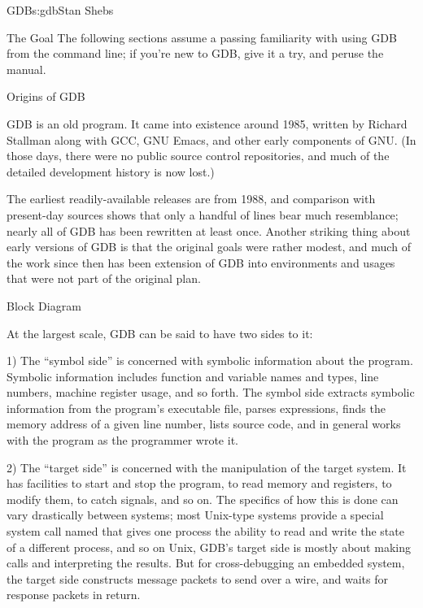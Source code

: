 \begin{aosachapter}{GDB}{s:gdb}{Stan Shebs}
\begin{aosasect1}{The Goal}
The following sections assume a passing familiarity with using GDB
from the command line; if you're new to GDB, give it a try, and peruse
the manual.\cite{bib:gdb-manual}

\end{aosasect1}

\begin{aosasect1}{Origins of GDB}

GDB is an old program.  It came into existence around 1985, written by
Richard Stallman along with GCC, GNU Emacs, and other early components
of GNU.  (In those days, there were no public source control
repositories, and much of the detailed development history is now
lost.)

The earliest readily-available releases are from 1988, and comparison
with present-day sources shows that only a handful of lines bear much
resemblance; nearly all of GDB has been rewritten at least once.
Another striking thing about early versions of GDB is that the
original goals were rather modest, and much of the work since then has
been extension of GDB into environments and usages that were not part
of the original plan.

\end{aosasect1}

\begin{aosasect1}{Block Diagram}


At the largest scale, GDB can be said to have two sides to it:

1) The ``symbol side'' is concerned with symbolic information about
the program.  Symbolic information includes function and variable
names and types, line numbers, machine register usage, and so forth.
The symbol side extracts symbolic information from the program's
executable file, parses expressions, finds the memory address of a
given line number, lists source code, and in general works with
the program as the programmer wrote it.

2) The ``target side'' is concerned with the manipulation of the
target system.  It has facilities to start and stop the program, to
read memory and registers, to modify them, to catch signals, and so
on.  The specifics of how this is done can vary drastically between
systems; most Unix-type systems provide a special system call named
 that gives one process the ability to read and write the
state of a different process, and so on Unix, GDB's target side is
mostly about making  calls and interpreting the results.
But for cross-debugging an embedded system, the target side constructs
message packets to send over a wire, and waits for response packets in
return.


\end{aosasect1}
\end{aosachapter}

